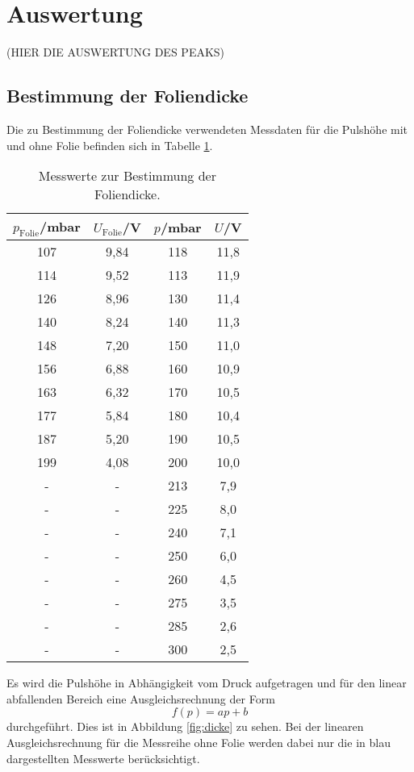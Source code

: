 \section{Auswertung}
\label{sec:Auswertung}


(HIER DIE AUSWERTUNG DES PEAKS)

\subsection{Bestimmung der Foliendicke}
\label{subsec:dicke}

Die zu Bestimmung der Foliendicke verwendeten Messdaten für die Pulshöhe
mit und ohne Folie befinden sich in Tabelle \ref{tab:dicke}.

\begin{table}[htp]
	\begin{center}
    \caption{Messwerte zur Bestimmung der Foliendicke.}
    \label{tab:dicke}
		\begin{tabular}{cccc}
		\toprule
			{$p_\text{Folie}$/mbar} & {$U_{\text{Folie}}$/V} & {$p$/mbar} & {$U$/V}\\
			\midrule
			107 & 9,84 & 118 & 11,8\\
			114 & 9,52 & 113 & 11,9\\
			126 & 8,96 & 130 & 11,4\\
			140 & 8,24 & 140 & 11,3\\
			148 & 7,20 & 150 & 11,0\\
			156 & 6,88 & 160 & 10,9\\
			163 & 6,32 & 170 & 10,5\\
			177 & 5,84 & 180 & 10,4\\
			187 & 5,20 & 190 & 10,5\\
			199 & 4,08 & 200 & 10,0\\
			- & -  & 213 & 7,9\\
			- & -  & 225 & 8,0\\
			- & -  & 240 & 7,1\\
			- & -  & 250 & 6,0\\
			- & -  & 260 & 4,5\\
			- & -  & 275 & 3,5\\
			- & -  & 285 & 2,6\\
			- & -  & 300 & 2,5\\
		\bottomrule
		\end{tabular}
	\end{center}
\end{table}

Es wird die Pulshöhe in Abhängigkeit vom Druck aufgetragen und für den
linear abfallenden Bereich eine Ausgleichsrechnung der Form
\begin{equation}
  f(p)=ap+b
\end{equation}
durchgeführt. Dies ist in Abbildung \ref{fig:dicke} zu sehen. Bei der linearen Ausgleichsrechnung
für die Messreihe ohne Folie werden dabei nur die in blau dargestellten Messwerte berücksichtigt.

